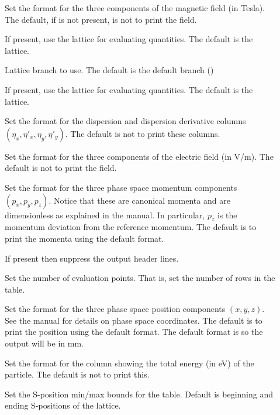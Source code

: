 {{{{{{{{{\begin{description}
\item[] \Newline
Set the format for the three components of the magnetic field (in Tesla). The default, if
 is not present, is not to print the field.
%
\item[] \Newline
If present, use the  lattice for evaluating quantities. The default is the 
lattice.
%
\item[] \Newline
Lattice branch to use. The default is the default branch ()
%
\item[] \Newline
If present, use the  lattice for evaluating quantities. The default is the 
lattice.
%
\item[] \Newline
Set the format for the dispersion and dispersion derivative columns $(\eta_x, \eta'_x, \eta_y, \eta'_y)$. 
The default is not to print these columns.
%
\item[] \Newline
Set the format for the three components of the electric field (in V/m). The default is not to print
the field.
%
\item[] \Newline
Set the format for the three phase space momentum components $(p_x, p_y, p_z)$. Notice that these
are canonical momenta and are dimensionless as explained in the \bmad manual. In particular, $p_z$
is the momentum deviation from the reference momentum. The default is to print the momenta using the
default format.
%
\item[] \Newline
If present then suppress the output header lines.
%
\item[] \Newline
Set the number of evaluation points. That is, set the number of rows in the table.
%
\item[] \Newline
Set the format for the three phase space position components $(x, y, z)$. See the \bmad manual for 
details on phase space coordinates. The default is to print the position using the default format.
The default format is  so the output will be in mm.
%
\item[] \Newline
Set the format for the column showing the total energy (in eV) of the particle. The default is not
to print this.
%
\item[] \Newline
Set the S-position min/max bounds for the table. Default is beginning and ending S-positions of the lattice.

\end{description}}}}}}}}}}
